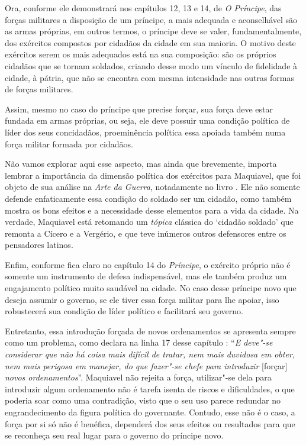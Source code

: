 Ora, conforme ele demonstrará nos capítulos 12, 13 e 14, de \emph{O
Príncipe}, das forças militares a disposição de um príncipe, a mais
adequada e aconselhável são as armas próprias, em outros termos, o
príncipe deve se valer, fundamentalmente, dos exércitos compostos por
cidadãos da cidade em sua maioria. O motivo deste exércitos serem os
mais adequados está na sua composição: são os próprios cidadãos que se
tornam soldados, criando desse modo um vínculo de fidelidade à cidade, à
pátria, que não se encontra com mesma intensidade nas outras formas de
forças militares.

Assim, mesmo no caso do príncipe que precise forçar, sua força deve
estar fundada em armas próprias, ou seja, ele deve possuir uma condição
política de líder dos seus concidadãos, proeminência política essa
apoiada também numa força militar formada por cidadãos.

Não vamos explorar aqui esse aspecto, mas ainda que brevemente, importa
lembrar a importância da dimensão política dos exércitos para Maquiavel,
que foi objeto de sua análise na \emph{Arte da Guerra}, notadamente no
livro . Ele não somente defende enfaticamente essa condição do soldado
ser um cidadão, como também mostra os bons efeitos e a necessidade desse
elementos para a vida da cidade. Na verdade, Maquiavel está retomando um
\emph{tópica} clássica do `cidadão soldado' que remonta a Cícero e a
Vergério, e que teve inúmeros outros defensores entre os pensadores
latinos.

Enfim, conforme fica claro no capítulo 14 do \emph{Príncipe}, o exército
próprio não é somente um instrumento de defesa indispensável, mas ele
também produz um engajamento político muito saudável na cidade. No caso
desse príncipe novo que deseja assumir o governo, se ele tiver essa
força militar para lhe apoiar, isso robustecerá sua condição de líder
político e facilitará seu governo.

Entretanto, essa introdução forçada de novos ordenamentos se apresenta
sempre como um problema, como declara na linha 17 desse capítulo :
``\emph{E deve"-se considerar que não há coisa mais difícil de tratar,
nem mais duvidosa em obter, nem mais perigosa em manejar, do que
fazer"-se chefe para introduzir} {[}forçar{]} \emph{novos
ordenamentos}''. Maquiavel não rejeita a força, utilizar"-se dela para
introduzir algum ordenamento não é tarefa isenta de riscos e
dificuldades, o que poderia soar como uma contradição, visto que o seu
uso parece redundar no engrandecimento da figura política do governante.
Contudo, esse não é o caso, a força por si só não é benéfica, dependerá
dos seus efeitos ou resultados para que se reconheça seu real lugar para
o governo do príncipe novo.

